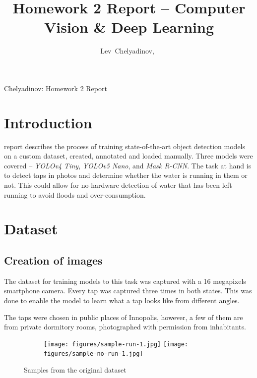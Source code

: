 \documentclass[journal,onecolumn]{IEEEtran}
\begin{document}
\title{Homework 2 Report – Computer Vision \& Deep Learning}

\author{Lev~Chelyadinov,~}%

%
{Chelyadinov: Homework 2 Report}

\maketitle

\section{Introduction}

 report describes the process of training state-of-the-art object detection models on a custom dataset, created, annotated and loaded manually. Three models were covered – \emph{YOLOv4 Tiny}, \emph{YOLOv5 Nano}, and \emph{Mask R-CNN}. The task at hand is to detect taps in photos and determine whether the water is running in them or not. This could allow for no-hardware detection of water that has been left running to avoid floods and over-consumption.


\section{Dataset}

\subsection{Creation of images}

The dataset for training models to this task was captured with a 16 megapixels smartphone camera. Every tap was captured three times in both states. This was done to enable the model to learn what a tap looks like from different angles.

The taps were chosen in public places of Innopolis, however, a few of them are from private dormitory rooms, photographed with permission from inhabitants.

\begin{figure}[htb]
    \centering
    \begin{subfigure}[b]{\textwidth}
        \centering
        \texttt{[image: figures/sample-run-1.jpg]}%
        \hfill
        \texttt{[image: figures/sample-no-run-1.jpg]}
    \end{subfigure}
    \caption{Samples from the original dataset}
\end{figure}
\end{document}
